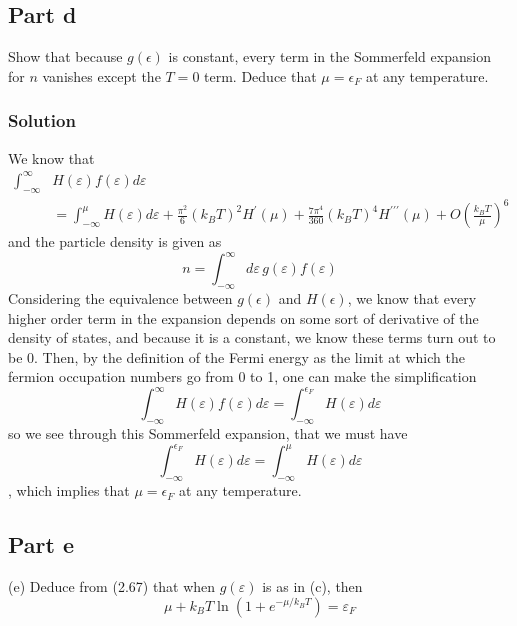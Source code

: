\documentclass[12pt]{article}
\begin{document}
\subsection{Part d}
Show that because \( g(\epsilon) \) is constant, every term in the Sommerfeld expansion for \( n \) vanishes except the \( T = 0 \) term. Deduce that \( \mu = \epsilon_F \) at any temperature.

\subsubsection{Solution}
We know that
\begin{equation}
    \begin{aligned}
\int_{-\infty}^{\infty} & H(\varepsilon) f(\varepsilon) d \varepsilon \\
& = \int_{-\infty}^\mu H(\varepsilon) d \varepsilon + \frac{\pi^2}{6}\left(k_B T\right)^2 H^{\prime}(\mu) + \frac{7 \pi^4}{360}\left(k_B T\right)^4 H^{\prime \prime \prime}(\mu) + O\left(\frac{k_B T}{\mu}\right)^6
\end{aligned}
\end{equation}
and the particle density is given as
\begin{equation}
    n = \int_{-\infty}^{\infty} d \varepsilon \, g(\varepsilon) f(\varepsilon)
\end{equation}
Considering the equivalence between \( g(\epsilon) \) and \( H(\epsilon) \), we know that every higher order term in the expansion depends on some sort of derivative of the density of states, and because it is a constant, we know these terms turn out to be 0. Then, by the definition of the Fermi energy as the limit at which the fermion occupation numbers go from 0 to 1, one can make the simplification
\begin{equation}
    \int_{-\infty}^{\infty} H(\varepsilon) f(\varepsilon) d \varepsilon = \int_{-\infty}^{\epsilon_F} H(\varepsilon) d \varepsilon
\end{equation}
so we see through this Sommerfeld expansion, that we must have
\begin{equation}
    \int_{-\infty}^{\epsilon_F} H(\varepsilon) d \varepsilon = \int_{-\infty}^{\mu } H(\varepsilon) d \varepsilon
\end{equation}
, which implies that \( \mu = \epsilon_F \) at any temperature.
\subsection{Part e}
(e) Deduce from (2.67) that when \( g(\varepsilon) \) is as in (c), then
\[
\mu + k_B T \ln \left(1 + e^{-\mu  / k_B T}\right) = \varepsilon_F
\]
\end{document}
